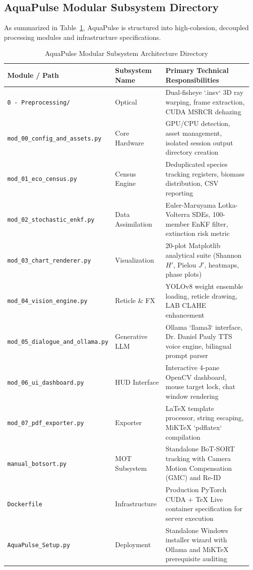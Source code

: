 \documentclass[11pt,a4paper]{article}
\newcommand{\refblue}[1]{{\color{linkblue}\ref{#1}}}
\begin{document}
\subsection{AquaPulse Modular Subsystem Directory}
\label{sec:app_codebase}
As summarized in Table~\refblue{tab:codebase_structure}, AquaPulse is structured into high-cohesion, decoupled processing modules and infrastructure specifications.

\begin{table}[h!]
\caption{AquaPulse Modular Subsystem Architecture Directory}
\label{tab:codebase_structure}
\centering
\small
\begin{tabular}{p{4.8cm} p{2.8cm} p{8.2cm}}
\toprule
\textbf{Module / Path} & \textbf{Subsystem Name} & \textbf{Primary Technical Responsibilities} \\
\midrule
\texttt{0 - Preprocessing/} & Optical & Dual-fisheye `.insv` 3D ray warping, frame extraction, CUDA MSRCR dehazing \\
\texttt{mod\_00\_config\_and\_assets.py} & Core Hardware & GPU/CPU detection, asset management, isolated session output directory creation \\
\texttt{mod\_01\_eco\_census.py} & Census Engine & Deduplicated species tracking registers, biomass distribution, CSV reporting \\
\texttt{mod\_02\_stochastic\_enkf.py} & Data Assimilation & Euler-Maruyama Lotka-Volterra SDEs, 100-member EnKF filter, extinction risk metric \\
\texttt{mod\_03\_chart\_renderer.py} & Visualization & 20-plot Matplotlib analytical suite (Shannon $H'$, Pielou $J'$, heatmaps, phase plots) \\
\texttt{mod\_04\_vision\_engine.py} & Reticle \& FX & YOLOv8 weight ensemble loading, reticle drawing, LAB CLAHE enhancement \\
\texttt{mod\_05\_dialogue\_and\_ollama.py} & Generative LLM & Ollama `llama3` interface, Dr. Daniel Pauly TTS voice engine, bilingual prompt parser \\
\texttt{mod\_06\_ui\_dashboard.py} & HUD Interface & Interactive 4-pane OpenCV dashboard, mouse target lock, chat window rendering \\
\texttt{mod\_07\_pdf\_exporter.py} & Exporter & LaTeX template processor, string escaping, MiKTeX `pdflatex` compilation \\
\texttt{manual\_botsort.py} & MOT Subsystem & Standalone BoT-SORT tracking with Camera Motion Compensation (GMC) and Re-ID \\
\texttt{Dockerfile} & Infrastructure & Production PyTorch CUDA + TeX Live container specification for server execution \\
\texttt{AquaPulse\_Setup.py} & Deployment & Standalone Windows installer wizard with Ollama and MiKTeX prerequisite auditing \\
\bottomrule
\end{tabular}
\end{table}
\end{document}
